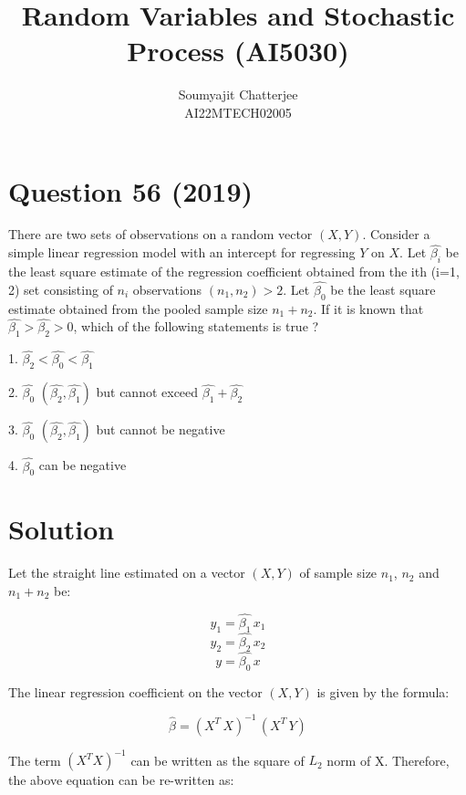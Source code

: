 \documentclass[12pt]{article}
\title{Random Variables and Stochastic Process (AI5030)}
\author{Soumyajit Chatterjee\\AI22MTECH02005 }
\begin{document}
\maketitle

\section*{Question 56 (2019)}
There are two sets of observations on a random vector $(X,Y)$. Consider a simple linear regression model with an intercept for regressing $Y$ on $X$. Let $\hat{\beta_i}$ be the least square estimate of the regression coefficient obtained from the ith (i=1, 2) set consisting of $n_i$ observations $(n_1, n_2) > 2$. Let $\hat{\beta_0}$ be the least square  estimate obtained from the pooled sample size $n_1+n_2$. If it is known that $\hat{\beta_1} > \hat{\beta_2} > 0$, which of the following statements is true ?
\vspace{1cm}

1. $\hat{\beta_2} < \hat{\beta_0} < \hat{\beta_1}$

2. $\hat{\beta_0}$  $(\hat{\beta_2}, \hat{\beta_1})$ but cannot exceed $\hat{\beta_1} + \hat{\beta_2}$

3. $\hat{\beta_0}$  $(\hat{\beta_2}, \hat{\beta_1})$ but cannot be negative

4. $\hat{\beta_0}$ can be negative
\vspace{1cm}

\section*{Solution}
Let the straight line estimated on a vector $(X,Y)$ of sample size $n_1$, $n_2$ and $n_1+n_2$ be:

\begin{equation}
y_1 = \hat{\beta_1}\, x_1
\end{equation}
\begin{equation}
y_2 = \hat{\beta_2}\, x_2
\end{equation}
\begin{equation}
y = \hat{\beta_0}\, x
\end{equation}

\noindent The linear regression coefficient on the vector $(X,Y)$ is given by the formula:

$$
\hat{\beta} = (X^T\,X)^{-1}\,(X^T\,Y)
$$

\noindent The term $(X^TX)^{-1}$ can be written as the square of $L_2$ norm of X. Therefore, the above equation can be re-written as:
\end{document}
